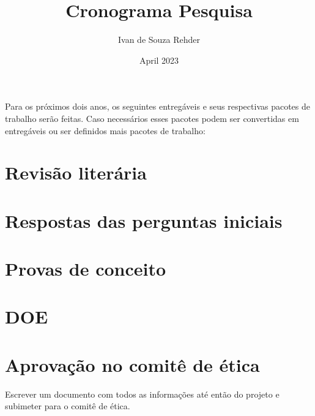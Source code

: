 \documentclass{article}
\title{Cronograma Pesquisa}
\author{Ivan de Souza Rehder}
\date{April 2023}
\begin{document}
\maketitle

Para os próximos dois anos, os seguintes entregáveis e seus respectivas pacotes de trabalho serão feitas. Caso necessários esses pacotes podem ser convertidas em entregáveis ou ser definidos mais pacotes de trabalho:

\section{Revisão literária}
\label{sec:revisao}


\section{Respostas das perguntas iniciais}
\label{sec:perguntas}



\section{Provas de conceito}
\label{sec:provas}


\section{DOE}
\label{sec:doe}


\section{Aprovação no comitê de ética}
\label{sec:etica}

Escrever um documento com todos as informações até então do projeto e subimeter para o comitê de ética.



\end{document}
